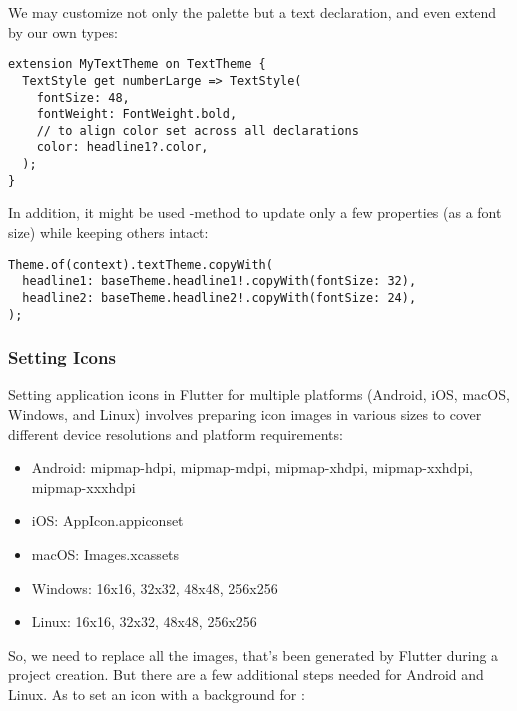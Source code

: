 We may customize not only the palette but a text declaration, and even extend  by our own types:

\begin{lstlisting}
extension MyTextTheme on TextTheme {
  TextStyle get numberLarge => TextStyle(
    fontSize: 48,
    fontWeight: FontWeight.bold,
    // to align color set across all declarations
    color: headline1?.color,
  );
}
\end{lstlisting}

\noindent In addition, it might be used -method to update only a few properties (as a font size) while 
keeping others intact: 
\newpage
\begin{lstlisting}
Theme.of(context).textTheme.copyWith(
  headline1: baseTheme.headline1!.copyWith(fontSize: 32),
  headline2: baseTheme.headline2!.copyWith(fontSize: 24),
);
\end{lstlisting}


\subsubsection{Setting Icons}

Setting application icons in Flutter for multiple platforms (Android, iOS, macOS, Windows, and Linux) involves 
preparing icon images in various sizes to cover different device resolutions and platform requirements:

\begin{itemize}
  \item Android: mipmap-hdpi, mipmap-mdpi, mipmap-xhdpi, mipmap-xxhdpi, mipmap-xxxhdpi
  \item iOS: AppIcon.appiconset
  \item macOS: Images.xcassets
  \item Windows: 16x16, 32x32, 48x48, 256x256
  \item Linux: 16x16, 32x32, 48x48, 256x256
\end{itemize}

\noindent So, we need to replace all the images, that's been generated by Flutter during a project creation. But there 
are a few additional steps needed for Android and Linux. As to set an icon with a background for :


